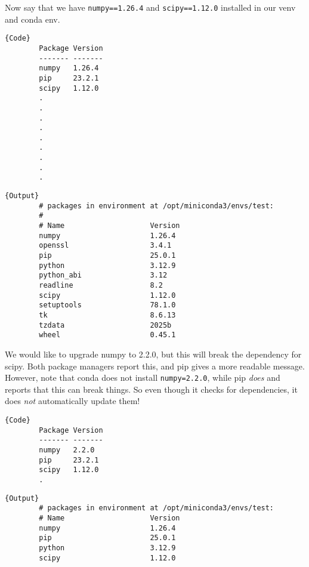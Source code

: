   \begin{example}
    Now say that we have \texttt{numpy==1.26.4} and \texttt{scipy==1.12.0} installed in our venv and conda env. 

    \noindent\begin{minipage}{.35\textwidth}
      \begin{lstlisting}[]{Code}
        Package Version
        ------- -------
        numpy   1.26.4
        pip     23.2.1
        scipy   1.12.0 
        .
        .
        .
        .
        .
        .
        .
        .
        .
      \end{lstlisting}
      \end{minipage}
      \hfill
      \begin{minipage}{.64\textwidth}
      \begin{lstlisting}[]{Output}
        # packages in environment at /opt/miniconda3/envs/test:
        #
        # Name                    Version   
        numpy                     1.26.4    
        openssl                   3.4.1     
        pip                       25.0.1    
        python                    3.12.9    
        python_abi                3.12      
        readline                  8.2       
        scipy                     1.12.0    
        setuptools                78.1.0    
        tk                        8.6.13    
        tzdata                    2025b     
        wheel                     0.45.1    
      \end{lstlisting}
    \end{minipage}

    We would like to upgrade numpy to 2.2.0, but this will break the dependency for scipy. Both package managers report this, and pip gives a more readable message. However, note that conda does not install \texttt{numpy=2.2.0}, while pip \textit{does} and reports that this can break things. So even though it checks for dependencies, it does \textit{not} automatically update them!

    \noindent\begin{minipage}{.35\textwidth}
      \begin{lstlisting}[]{Code}
        Package Version
        ------- -------
        numpy   2.2.0
        pip     23.2.1
        scipy   1.12.0 
        .
      \end{lstlisting}
      \end{minipage}
      \hfill
      \begin{minipage}{.64\textwidth}
      \begin{lstlisting}[]{Output}
        # packages in environment at /opt/miniconda3/envs/test:
        # Name                    Version   
        numpy                     1.26.4    
        pip                       25.0.1    
        python                    3.12.9    
        scipy                     1.12.0    
      \end{lstlisting}
    \end{minipage}
  \end{example}

